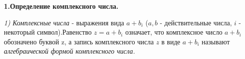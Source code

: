\documentclass[a5paper, 10pt]{book}
\author{Александр Недосекин}
\date{1.03.2023}
\begin{document}
    \begin{center}
    \end{center}
    \par \textbf{1.Определение комплексного числа.}
    \par \textit{1) Комплексные числа} - выражения вида $a + b_{i}$ ($a, b$ - действительные числа, $i$ - некоторый символ).Равенство $z = a + b_{i}$ означает, что комплексное число $a + b_{i}$ обозначено буквой z, а запись комплексного числа $z$ в виде $a + b_{i}$ называют \textit{алгебраической формой комплексного числа.}
    
\newpage
    
\setcounter{page}{37}
\end{document}
